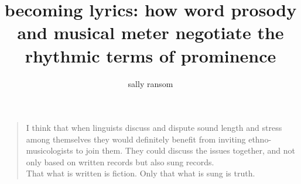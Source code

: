 \documentclass[12pt]{report}	%
\author{sally ransom}  	%
\title{becoming lyrics: how word prosody and musical meter negotiate the rhythmic terms of prominence}
\theoremstyle{plain} %
\theoremstyle{definition}
\theoremstyle{remark}
\numberwithin{equation}{section}
\begin{document}
\copyrightpage          %


%
%

\titlepage              %
%
\commcertpage           %





%
\begin{dedication}
%

\begin{quotation}
{\scriptsize I think that when linguists discuss and dispute sound length and stress among themselves they would definitely benefit from inviting ethno-musicologists to join them. They could discuss the issues together, and not only based on written records but also sung records. \\ 
That what is written is fiction. Only that what is sung is truth. \\
\cite{tormis2007} }



\end{quotation}

\end{dedication}




%
\utabstract
{}%
\indent
%
%
\end{document}
